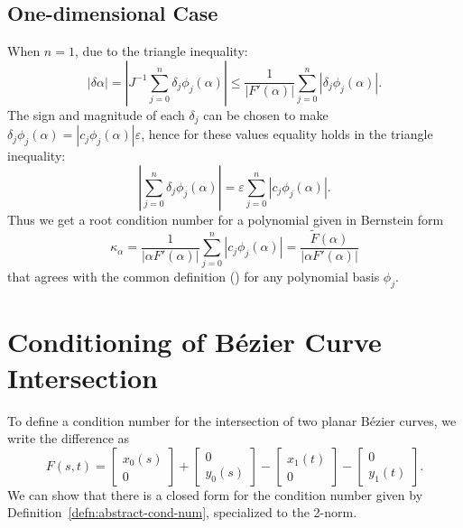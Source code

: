 \documentclass[3p, authoryear, square]{elsarticle}
\theoremstyle{definition}
\newcommand{\eps}{\varepsilon}
\begin{document}
\subsection{One-dimensional Case}

When \(n = 1\), due to the triangle inequality:
\begin{equation}\label{eq:tri-ineq}
\left|\delta \alpha\right| = \left|J^{-1} \sum_{j = 0}^n
  \delta_j \phi_j(\alpha)\right| \leq \frac{1}{\left|F'(\alpha)\right|}
  \sum_{j = 0}^n \left|\delta_j \phi_j(\alpha)\right|.
\end{equation}
The sign and magnitude of each \(\delta_j\) can be chosen to make
\(\delta_j \phi_j(\alpha) = \left|c_j \phi_j(\alpha)\right| \eps\),
hence for these values equality holds in the triangle inequality:
\begin{equation}
\left|\sum_{j = 0}^n \delta_j \phi_j(\alpha)\right| =
\eps \sum_{j = 0}^n \left|c_j \phi_j(\alpha)\right|.
\end{equation}
Thus we get a root condition number for a polynomial given in Bernstein form
\begin{equation}\label{eq:bernstein-cond-num}
\kappa_{\alpha} =
  \frac{1}{\left|\alpha F'(\alpha)\right|} \sum_{j = 0}^n \left|
  c_j \phi_j(\alpha)\right| =
  \frac{\widetilde{F}(\alpha)}{\left|\alpha F'(\alpha)\right|}
\end{equation}
that agrees with the common definition
(\cite[Equation~12.33]{Farouki2008}) for any polynomial basis
\(\phi_j\).

\section{Conditioning of B\'{e}zier Curve Intersection}

To define a condition number for the intersection of two planar B\'{e}zier
curves, we write the difference as
\begin{equation}
F(s, t) = \left[ \begin{array}{c} x_0(s) \\ 0 \end{array}\right] +
  \left[ \begin{array}{c} 0 \\ y_0(s) \end{array}\right] -
  \left[ \begin{array}{c} x_1(t) \\ 0 \end{array}\right] -
  \left[ \begin{array}{c} 0 \\ y_1(t) \end{array}\right].
\end{equation}
We can show that there is a closed form for the condition number given
by Definition~\ref{defn:abstract-cond-num}, specialized to the
2-norm.
\end{document}

